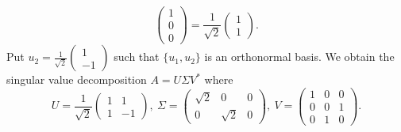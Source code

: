 \begin{Exercise}
\begin{enumerate}[(a)]
\begin{solution}
$$\begin{pmatrix}
			1 \\
			0 \\
			0
			\end{pmatrix} = \frac{1}{\sqrt{2}}\begin{pmatrix}
			1 \\
			1
			\end{pmatrix}.
			$$
			Put $u_2 = \frac{1}{\sqrt{2}}\begin{pmatrix}
			1 \\
			-1 
			\end{pmatrix}$ such that $\{u_1, u_2\}$ is an orthonormal basis.
			We obtain the singular value decomposition $A = U\Sigma V^*$ where
			$$
			U = \frac{1}{\sqrt{2}}\begin{pmatrix}
			1 & 1 \\
			1 & -1
			\end{pmatrix},~ \Sigma = \begin{pmatrix}
			\sqrt{2} & 0 & 0 \\
			0 & \sqrt{2} & 0
			\end{pmatrix},~ V =\begin{pmatrix}
			1 & 0 & 0 \\
			0 & 0 & 1 \\
			0 & 1 & 0
			\end{pmatrix}.
			$$ 
		\end{solution}
	\end{enumerate}
\end{Exercise}